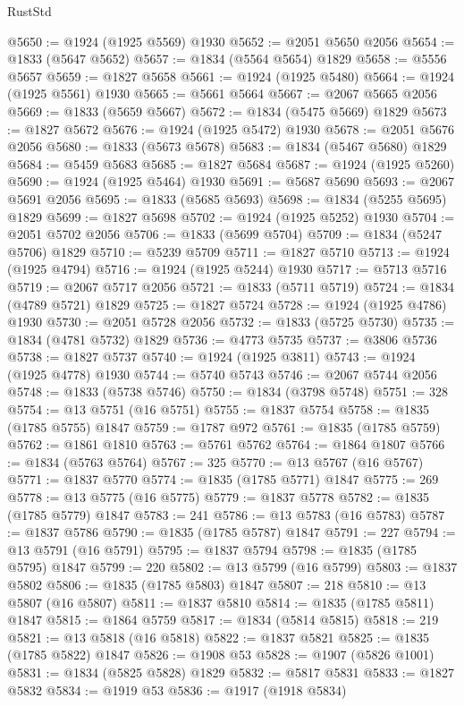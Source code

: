 \begin{lexlean}{RustStd}
\begin{coremodule}
@5650 := @1924 (@1925 @5569) @1930
@5652 := @2051 @5650 @2056
@5654 := @1833 (@5647 @5652)
@5657 := @1834 (@5564 @5654) @1829
@5658 := @5556 @5657
@5659 := @1827 @5658
@5661 := @1924 (@1925 @5480)
@5664 := @1924 (@1925 @5561) @1930
@5665 := @5661 @5664
@5667 := @2067 @5665 @2056
@5669 := @1833 (@5659 @5667)
@5672 := @1834 (@5475 @5669) @1829
@5673 := @1827 @5672
@5676 := @1924 (@1925 @5472) @1930
@5678 := @2051 @5676 @2056
@5680 := @1833 (@5673 @5678)
@5683 := @1834 (@5467 @5680) @1829
@5684 := @5459 @5683
@5685 := @1827 @5684
@5687 := @1924 (@1925 @5260)
@5690 := @1924 (@1925 @5464) @1930
@5691 := @5687 @5690
@5693 := @2067 @5691 @2056
@5695 := @1833 (@5685 @5693)
@5698 := @1834 (@5255 @5695) @1829
@5699 := @1827 @5698
@5702 := @1924 (@1925 @5252) @1930
@5704 := @2051 @5702 @2056
@5706 := @1833 (@5699 @5704)
@5709 := @1834 (@5247 @5706) @1829
@5710 := @5239 @5709
@5711 := @1827 @5710
@5713 := @1924 (@1925 @4794)
@5716 := @1924 (@1925 @5244) @1930
@5717 := @5713 @5716
@5719 := @2067 @5717 @2056
@5721 := @1833 (@5711 @5719)
@5724 := @1834 (@4789 @5721) @1829
@5725 := @1827 @5724
@5728 := @1924 (@1925 @4786) @1930
@5730 := @2051 @5728 @2056
@5732 := @1833 (@5725 @5730)
@5735 := @1834 (@4781 @5732) @1829
@5736 := @4773 @5735
@5737 := @3806 @5736
@5738 := @1827 @5737
@5740 := @1924 (@1925 @3811)
@5743 := @1924 (@1925 @4778) @1930
@5744 := @5740 @5743
@5746 := @2067 @5744 @2056
@5748 := @1833 (@5738 @5746)
@5750 := @1834 (@3798 @5748)
@5751 := 328
@5754 := @13 @5751 (@16 @5751)
@5755 := @1837 @5754
@5758 := @1835 (@1785 @5755) @1847
@5759 := @1787 @972
@5761 := @1835 (@1785 @5759)
@5762 := @1861 @1810
@5763 := @5761 @5762
@5764 := @1864 @1807
@5766 := @1834 (@5763 @5764)
@5767 := 325
@5770 := @13 @5767 (@16 @5767)
@5771 := @1837 @5770
@5774 := @1835 (@1785 @5771) @1847
@5775 := 269
@5778 := @13 @5775 (@16 @5775)
@5779 := @1837 @5778
@5782 := @1835 (@1785 @5779) @1847
@5783 := 241
@5786 := @13 @5783 (@16 @5783)
@5787 := @1837 @5786
@5790 := @1835 (@1785 @5787) @1847
@5791 := 227
@5794 := @13 @5791 (@16 @5791)
@5795 := @1837 @5794
@5798 := @1835 (@1785 @5795) @1847
@5799 := 220
@5802 := @13 @5799 (@16 @5799)
@5803 := @1837 @5802
@5806 := @1835 (@1785 @5803) @1847
@5807 := 218
@5810 := @13 @5807 (@16 @5807)
@5811 := @1837 @5810
@5814 := @1835 (@1785 @5811) @1847
@5815 := @1864 @5759
@5817 := @1834 (@5814 @5815)
@5818 := 219
@5821 := @13 @5818 (@16 @5818)
@5822 := @1837 @5821
@5825 := @1835 (@1785 @5822) @1847
@5826 := @1908 @53
@5828 := @1907 (@5826 @1001)
@5831 := @1834 (@5825 @5828) @1829
@5832 := @5817 @5831
@5833 := @1827 @5832
@5834 := @1919 @53
@5836 := @1917 (@1918 @5834)

\end{coremodule}
\end{lexlean}

